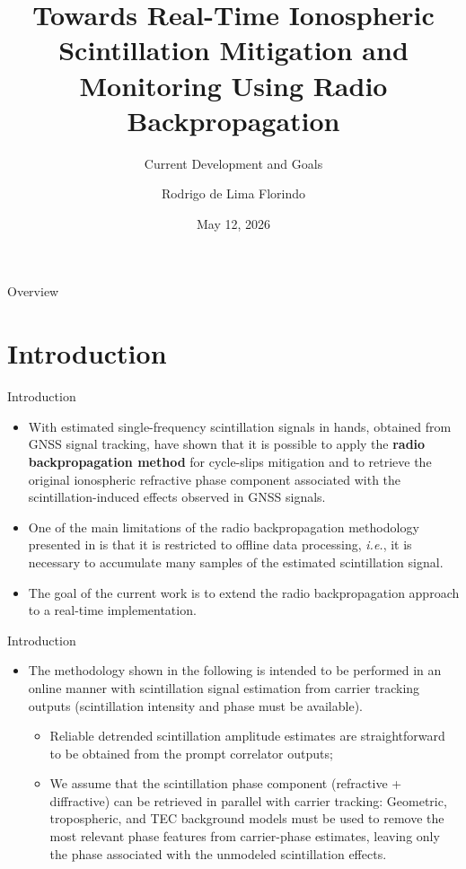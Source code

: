 \documentclass[10pt]{beamer}
\title{Towards Real-Time Ionospheric Scintillation Mitigation and Monitoring Using Radio Backpropagation}
\subtitle{Current Development and Goals}
\author{Rodrigo de Lima Florindo}
\institute{Aeronautics Institute of Technology}
\date{May 12, 2026}
\begin{document}
\maketitle

\begin{frame}{Overview}
    \tableofcontents
\end{frame}

\section{Introduction}

\begin{frame}{Introduction}
    \begin{itemize}
        \item With estimated single-frequency scintillation signals in hands, obtained from GNSS signal tracking, \parencite{breitschMitigationGlobalNavigation2023} have shown that it is possible to apply the \textbf{radio backpropagation method} for cycle-slips mitigation and to retrieve the original ionospheric refractive phase component associated with the scintillation-induced effects observed in GNSS signals.
        \item One of the main limitations of the radio backpropagation methodology presented in \parencite{breitschMitigationGlobalNavigation2023} is that it is restricted to offline data processing, \textit{i.e.}, it is necessary to accumulate many samples of the estimated scintillation signal.
        \item The goal of the current work is to extend the radio backpropagation approach to a real-time implementation. 
    \end{itemize}
\end{frame}

\begin{frame}{Introduction}
    \begin{itemize}
        \item The methodology shown in the following is intended to be performed in an online manner with scintillation signal estimation from carrier tracking outputs (scintillation intensity and phase must be available).
        \begin{itemize}
            \item Reliable detrended scintillation amplitude estimates are straightforward to be obtained from the prompt correlator outputs;
            \item We assume that the scintillation phase component (refractive + diffractive) can be retrieved in parallel with carrier tracking: Geometric, tropospheric, and TEC background models must be used to remove the most relevant phase features from carrier-phase estimates, leaving only the phase associated with the unmodeled scintillation effects.
        \end{itemize}
    \end{itemize}
\end{frame}
\end{document}
